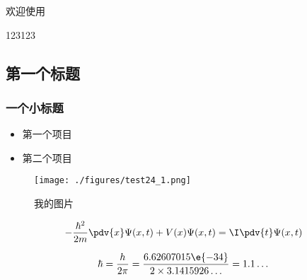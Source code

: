 
欢迎使用

123123

\subsection{第一个标题}
\subsubsection{一个小标题}

\begin{itemize}
\item 第一个项目
\item 第二个项目
\end{itemize}

\begin{figure}[ht]
\centering
\texttt{[image: ./figures/test24\_1.png]}
\caption{我的图片} \label{test24_fig1}
\end{figure}

\begin{equation}
-\frac{\hbar^2}{2m} \pdv{x} \Psi(x, t) + V(x) \Psi(x,t) = \I\pdv{t}\Psi(x,t)
\end{equation}

\begin{equation}
\hbar = \frac{h}{2\pi} = \frac{6.62607015\e{-34}}{2\times 3.1415926\dots} = 1.1\dots
\end{equation}
